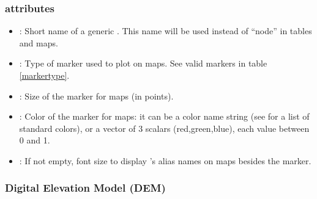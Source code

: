 \subsubsection{ attributes}
\begin{itemize}

\item {}: Short name of a generic . This name will be used instead of ``node'' in tables and maps.

\item {}: Type of marker used to plot  on maps. See valid markers in table \ref{markertype}.

\item {}: Size of the  marker for maps (in points).

\item {}: Color of the  marker for maps: it can be a color name string (see  for a list of standard colors), or a vector of 3 scalars (red,green,blue), each value between 0 and 1.

\item {}: If not empty, font size to display 's alias names on maps besides the marker.

\end{itemize}

\subsubsection{Digital Elevation Model (DEM)}
\label{dem}

